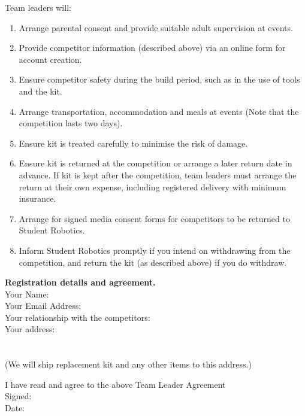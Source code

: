 \documentclass[a4paper, 11pt]{scrartcl}
\begin{document}
Team leaders will:

\begin{enumerate}
\item Arrange parental consent and provide suitable adult supervision at
events.

\item Provide competitor information (described above) via an online form for
account creation.

\item Ensure competitor safety during the build period, such as in the use of
tools and the kit.

\item Arrange transportation, accommodation and meals at events (Note that
the competition lasts two days).

\item Ensure kit is treated carefully to minimise the risk of damage.

\item Ensure kit is returned at the competition or arrange a later return
date in advance.  If kit is kept after the competition, team leaders must
arrange the return at their own expense, including registered delivery with
minimum  insurance.

\item Arrange for signed media consent forms for competitors to be returned
to Student Robotics.

\item Inform Student Robotics promptly if you intend on withdrawing from the
competition, and return the kit (as described above) if you do withdraw.

\end{enumerate}

\appendix



\noindent
\textbf{Registration details and agreement.} \\
\doublespacing
\noindent
Your Name:\hrulefill\\
Your Email Address:\hrulefill\\
Your relationship with the competitors:\hrulefill\\
Your address:\hrulefill\\
\hbox{}\hrulefill\\
\hbox{}\hrulefill\\
(We will ship replacement kit and any other items to this address.)

\noindent
\dotfill\hfill

\noindent
I have read and agree to the above Team Leader Agreement\\
Signed:\hrulefill\\
Date:\hrulefill\\

\singlespacing
\end{document}
